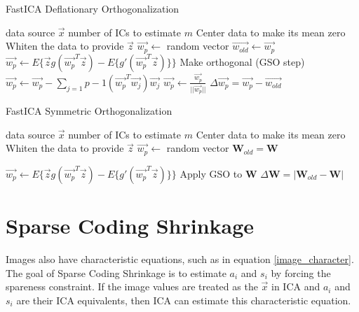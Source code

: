 \documentclass[12pt ]{article}
\begin{document}
\begin{algorithm}
\caption{FastICA Deflationary Orthogonalization}
\label{alg:FastICA-Deflationary-Orthogonalization}
\begin{algorithmic}
	\REQUIRE data source $\vec{x}$
	\REQUIRE number of ICs to estimate $m$
	\STATE Center data to make its mean zero
	\STATE Whiten the data to provide $\vec{z}$
	\STATE $\vec{w_p} \leftarrow$ random vector
	\REPEAT
		\STATE $\vec{w_{old}} \leftarrow \vec{w_p}$
		\STATE $\vec{w_p} \leftarrow E \{ \vec{z} g(\vec{w_p}^T \vec{z}) - E\{ g' (\vec{w_p}^T \vec{z}) \} \}$
		\STATE Make orthogonal (GSO step) $\vec{w_p} \leftarrow \vec{w_p} - \sum _{j=1}{p-1} (\vec{w_p}^T\vec{w_j})\vec{w_j}$ 
		\STATE $\vec{w_p} \leftarrow \frac{\vec{w_p}}{||\vec{w_p}||}$
		\STATE $\Delta \vec{w_p} = \vec{w_p} - \vec{w_{old}}$
	\ENDFOR
\end{algorithmic}
\end{algorithm}

\begin{algorithm}
\caption{FastICA Symmetric Orthogonalization}
\label{alg:FastICA-Symmetric-Orthogonalization}
\begin{algorithmic}
	\REQUIRE data source $\vec{x}$
	\REQUIRE number of ICs to estimate $m$
	\STATE Center data to make its mean zero
	\STATE Whiten the data to provide $\vec{z}$
	\STATE $\vec{w_p} \leftarrow$ random vector
	\ENDFOR
	\REPEAT
	\STATE $\mathbf{W}_{old} = \mathbf{W}$
	
		\STATE $\vec{w_p} \leftarrow E \{ \vec{z} g(\vec{w_p}^T \vec{z}) - E\{ g' (\vec{w_p}^T \vec{z}) \} \}$
	\ENDFOR 
	\STATE Apply GSO to $\mathbf{W}$ 
	\STATE $\Delta \mathbf{W} = |\mathbf{W}_{old} - \mathbf{W}|$

\end{algorithmic}
\end{algorithm}


\section{Sparse Coding Shrinkage}
Images also have characteristic equations, such as in equation \ref{image_character}.  The goal of Sparse Coding Shrinkage is to estimate $a_i$ and $s_i$ by forcing the spareness constraint.  %
If the image values are treated as the $\vec{x}$ in ICA and $a_i$ and $s_i$ are their ICA equivalents, then ICA can estimate this characteristic equation. 
\end{document}
